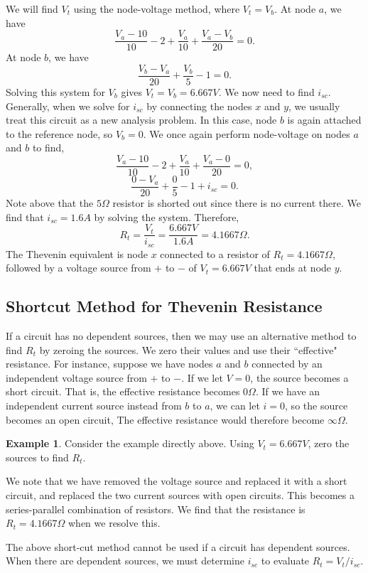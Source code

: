 \documentclass[11pt]{article}
\theoremstyle{plain} %
\theoremstyle{definition}
\theoremstyle{example}
\newtheorem*{example}{Example}
\theoremstyle{remark}
\begin{document}
We will find $V_t$ using the node-voltage method, where $V_t = V_b$. At node $a$, we have 
$$\frac{V_a-10}{10} - 2 + \frac{V_a}{10} + \frac{V_a-V_b}{20} = 0.$$
At node $b$, we have 
$$\frac{V_b-V_a}{20} + \frac{V_b}{5} -1 = 0.$$
Solving this system for $V_b$ gives $V_t = V_b = 6.667V$. 
We now need to find $i_{sc}$. Generally, when we solve for $i_{sc}$ by connecting the nodes $x$ and $y$, we usually treat this circuit as a new analysis problem. In this case, node $b$ is again attached to the reference node, so $V_b  = 0$. We once again perform node-voltage on nodes $a$ and $b$ to find,
$$\frac{V_a-10}{10} - 2 + \frac{V_a}{10} + \frac{V_a-0}{20} = 0,$$
$$\frac{0-V_a}{20} + \frac{0}{5} -1 +i_{sc}= 0.$$
Note above that the $5\Omega$ resistor is shorted out since there is no current there. We find that $i_{sc} = 1.6A$ by solving the system. Therefore, 
$$R_t = \frac{V_t}{i_{sc}} = \frac{6.667V}{1.6A} = 4.1667\Omega.$$
The Thevenin equivalent is node $x$ connected to a resistor of $R_t = 4.1667\Omega$, followed by a voltage source from $+$ to $-$ of $V_t   = 6.667V$ that ends at node $y$. 


\subsection{Shortcut Method for Thevenin Resistance}
If a circuit has no dependent sources, then we may use an alternative method to find $R_t$ by zeroing the sources. We zero their values and use their ``effective" resistance. For instance, suppose we have nodes $a$ and $b$ connected by an independent voltage source from $+$ to $-$. If we let $V=0$, the source becomes a short circuit. That is, the effective resistance becomes $0\Omega$. If we have an independent current source instead from $b$ to $a$, we can let $i=0$, so the source becomes an open circuit, The effective resistance would therefore become $\infty \Omega$. 

\begin{example}
Consider the example directly above. Using $V_t  = 6.667V$, zero the sources to find $R_t$. 
\end{example}

We note that we have removed the voltage source and replaced it with a short circuit, and replaced the two current sources with open circuits. This becomes a series-parallel combination of resistors. We find that the resistance is $R_t = 4.1667\Omega$ when we resolve this. 

The above short-cut method cannot be used if a circuit has dependent sources. When there are dependent sources, we must determine $i_{sc}$ to evaluate $R_t = V_t/i_{sc}$. 
\end{document}
